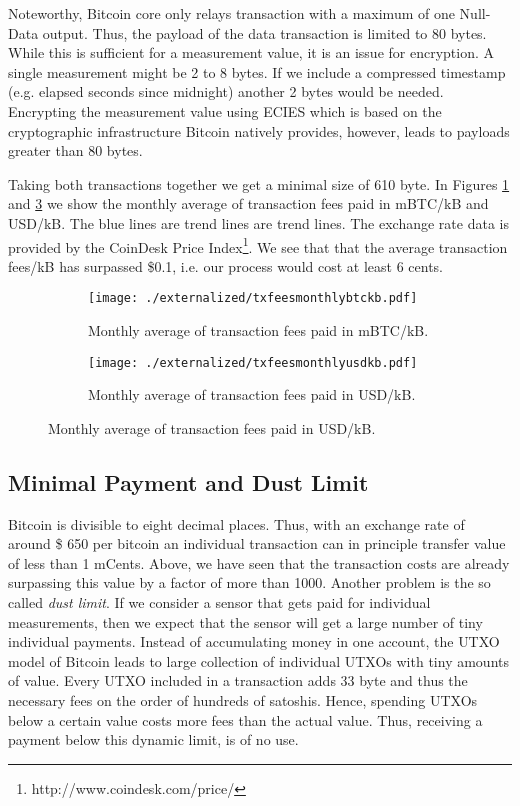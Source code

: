 Noteworthy, Bitcoin core only relays transaction with a maximum of one Null-Data output. Thus, the payload of the data transaction is limited to 80 bytes. While this is sufficient for a measurement value, it is an issue for encryption. A single measurement might be 2 to 8 bytes. If we include a compressed timestamp (e.g. elapsed seconds since midnight) another 2 bytes would be needed. Encrypting the measurement value using \ac{ECIES} which is based on the cryptographic infrastructure Bitcoin natively provides, however, leads to payloads greater than 80 bytes.

Taking both transactions together we get a minimal size of 610 byte. In Figures \ref{fig:tx_fees_btc} and \ref{fig:tx_fees_usd} we show the monthly average of transaction fees paid in mBTC/kB and USD/kB. The blue lines are trend lines are trend lines. The exchange rate data is provided by the CoinDesk Price Index\footnote{http://www.coindesk.com/price/}. We see that that the average transaction fees/kB has surpassed \$0.1, i.e. our process would cost at least 6 cents.

\begin{figure}[ht]
  \centering
  \begin{subfigure}[t]{0.5\linewidth}
    \centering\texttt{[image: ./externalized/txfeesmonthlybtckb.pdf]}
    \caption{Monthly average of transaction fees paid in mBTC/kB.
    \label{fig:tx_fees_btc}}
  \end{subfigure}%
  \begin{subfigure}[t]{0.5\linewidth}
    \centering\texttt{[image: ./externalized/txfeesmonthlyusdkb.pdf]}
    \caption{Monthly average of transaction fees paid in USD/kB.
    \label{fig:tx_fees_usd}}
  \end{subfigure}
\end{figure}

\subsection{Minimal Payment and Dust Limit}

Bitcoin is divisible to eight decimal places. Thus, with an exchange rate of around \$ 650 per bitcoin an individual transaction can in principle transfer value of less than 1 mCents. Above, we have seen that the transaction costs are already surpassing this value by a factor of more than 1000. Another problem is the so called \emph{dust limit}. If we consider a sensor that gets paid for individual measurements, then we expect that the sensor will get a large number of tiny individual payments. Instead of accumulating money in one account, the \ac{UTXO} model of Bitcoin leads to large collection of individual \ac{UTXO}s with tiny amounts of value. Every \ac{UTXO} included in a transaction adds 33 byte and thus the necessary fees on the order of hundreds of satoshis. Hence, spending \ac{UTXO}s below a certain value costs more fees than the actual value. Thus, receiving a payment below this dynamic limit, is of no use.

